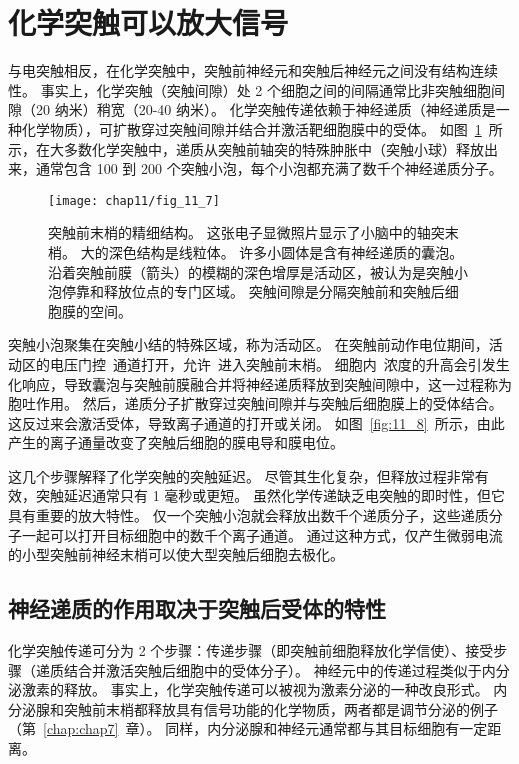 \section{化学突触可以放大信号}

与电突触相反，在化学突触中，突触前神经元和突触后神经元之间没有结构连续性。
事实上，化学突触（突触间隙）处 2 个细胞之间的间隔通常比非突触细胞间隙（20 纳米）稍宽（20-40 纳米）。
化学突触传递依赖于神经递质（神经递质是一种化学物质），可扩散穿过突触间隙并结合并激活靶细胞膜中的受体。
如图~\ref{fig:11_7}~所示，在大多数化学突触中，递质从突触前轴突的特殊肿胀中（突触小球）释放出来，通常包含 100 到 200 个突触小泡，每个小泡都充满了数千个神经递质分子。


\begin{figure}[htbp]
	\centering
	\texttt{[image: chap11/fig\_11\_7]}
	\caption{突触前末梢的精细结构。
		这张电子显微照片显示了小脑中的轴突末梢。
		大的深色结构是线粒体。
		许多小圆体是含有神经递质的囊泡。
		沿着突触前膜（箭头）的模糊的深色增厚是活动区，被认为是突触小泡停靠和释放位点的专门区域。
		突触间隙是分隔突触前和突触后细胞膜的空间。}
	\label{fig:11_7}
\end{figure}


突触小泡聚集在突触小结的特殊区域，称为活动区。
在突触前动作电位期间，活动区的电压门控~通道打开，允许~进入突触前末梢。
细胞内~浓度的升高会引发生化响应，导致囊泡与突触前膜融合并将神经递质释放到突触间隙中，这一过程称为胞吐作用。
然后，递质分子扩散穿过突触间隙并与突触后细胞膜上的受体结合。
这反过来会激活受体，导致离子通道的打开或关闭。
如图~\ref{fig:11_8}~所示，由此产生的离子通量改变了突触后细胞的膜电导和膜电位。


这几个步骤解释了化学突触的突触延迟。
尽管其生化复杂，但释放过程非常有效，突触延迟通常只有 1 毫秒或更短。
虽然化学传递缺乏电突触的即时性，但它具有重要的放大特性。
仅一个突触小泡就会释放出数千个递质分子，这些递质分子一起可以打开目标细胞中的数千个离子通道。
通过这种方式，仅产生微弱电流的小型突触前神经末梢可以使大型突触后细胞去极化。



\subsection{神经递质的作用取决于突触后受体的特性}

化学突触传递可分为 2 个步骤：传递步骤（即突触前细胞释放化学信使）、接受步骤（递质结合并激活突触后细胞中的受体分子）。
神经元中的传递过程类似于内分泌激素的释放。
事实上，化学突触传递可以被视为激素分泌的一种改良形式。
内分泌腺和突触前末梢都释放具有信号功能的化学物质，两者都是调节分泌的例子（第~\ref{chap:chap7}~章）。
同样，内分泌腺和神经元通常都与其目标细胞有一定距离。


